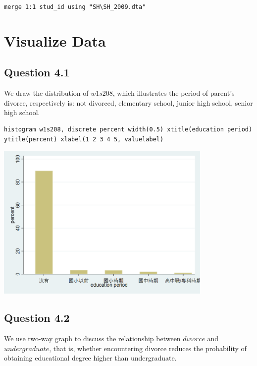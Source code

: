 \documentclass[11pt, letterpaper]{article}
\begin{document}
\begin{lstlisting}
merge 1:1 stud_id using "SH\SH_2009.dta"
\end{lstlisting}


\section{Visualize Data}

\subsection*{Question 4.1}

We draw the distribution of $\textit{w1s208}$, which illustrates the period of parent's divorce, respectively is: not divorced, elementary school, junior high school, senior high school.

\begin{lstlisting}
histogram w1s208, discrete percent width(0.5) xtitle(education period) ytitle(percent) xlabel(1 2 3 4 5, valuelabel)
\end{lstlisting}
\includegraphics[height=3in]{histogram.png}


\subsection*{Question 4.2}

We use two-way graph to discuss the relationship between $\textit{divorce}$ and $\textit{undergraduate}$, that is, whether encountering divorce reduces the probability of obtaining educational degree higher than undergraduate.
\end{document}
